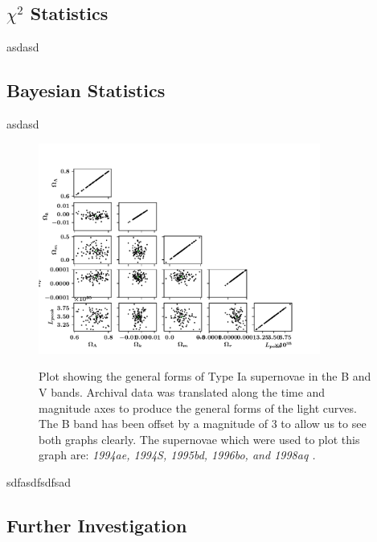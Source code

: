 \documentclass[twocolumn]{revtex4}
\begin{document}
\vspace{-3ex}
\subsection{$\chi^2$ Statistics} 
\vspace{-2ex}

asdasd

\vspace{-3ex}
\subsection{Bayesian Statistics} 
\vspace{-2ex}

asdasd


\begin{figure}[!h]
\begin{center}
\includegraphics[width=9.25cm]{results/triangle}
\caption[]{Plot showing the general forms of Type Ia supernovae in the B and V bands. Archival data was translated along the time and magnitude axes to produce the general forms of the light curves. The B band has been offset by a magnitude of $3$ to allow us to see both graphs clearly. The supernovae which were used to plot this graph are: \em{1994ae, 1994S, 1995bd, 1996bo, }\em  and \em{1998aq }\em \cite{jha, matheson}. }
\vspace{-3ex}
\label{fig:triangle}
\end{center}
\end{figure}


sdfasdfsdfsad

\vspace{-3ex}
\subsection{Further Investigation} 
\vspace{-2ex}
\end{document}
